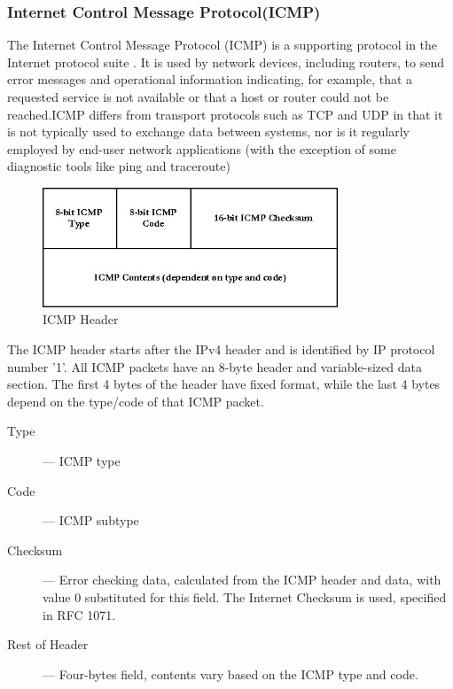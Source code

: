 \documentclass[12pt]{article}
\theoremstyle{definition}
\begin{document}
			\subsubsection{Internet Control Message Protocol(ICMP)}
			The Internet Control Message Protocol (ICMP) is a supporting protocol in the Internet protocol suite \cite{So-In2016}. It is used by network devices, including routers, to send error messages and operational information indicating, for example, that a requested service is not available or that a host or router could not be reached.ICMP differs from transport protocols such as TCP and UDP in that it is not typically used to exchange data between systems, nor is it regularly employed by end-user network applications (with the exception of some diagnostic tools like ping and traceroute)
			
			\begin{figure}[!h]
				\centering
				\includegraphics[width=250pt]{pictures/icmp_header.png}
				\caption{ICMP Header\cite{AlEroud2017}}
				\label{fig:icmp-header}
			\end{figure}
			The ICMP header starts after the IPv4 header and is identified by IP protocol number '1'. All ICMP packets have an 8-byte header and variable-sized data section. The first 4 bytes of the header have fixed format, while the last 4 bytes depend on the type/code of that ICMP packet.
			
			
			\begin{description}
				\item [Type ] --- ICMP type
				\item [Code ] --- ICMP subtype
				\item [Checksum] --- Error checking data, calculated from the ICMP header and data, with value 0 substituted for this field. The Internet Checksum is used, specified in RFC 1071.
				\item [Rest of Header] --- Four-bytes field, contents vary based on the ICMP type and code.
			\end{description}
			
	
	\cleardoublepage
\end{document}
